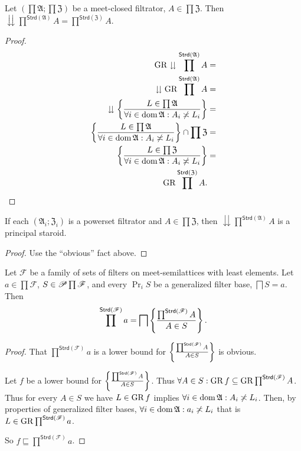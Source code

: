 \begin{prop}
Let $\left(\prod\mathfrak{A};\prod\mathfrak{Z}\right)$ be a meet-closed
filtrator, $A\in\prod\mathfrak{Z}$. Then $\downdownarrows\prod^{\mathsf{Strd}(\mathfrak{A})}A=\prod^{\mathsf{Strd}(\mathfrak{Z})}A$.\end{prop}
\begin{proof}
~
\begin{align*}
\operatorname{GR}\downdownarrows\prod^{\mathsf{Strd}(\mathfrak{A})}A & =\\
\downdownarrows\operatorname{GR}\prod^{\mathsf{Strd}(\mathfrak{A})}A & =\\
\downdownarrows\left\{ \frac{L\in\prod\mathfrak{A}}{\forall i\in\operatorname{dom}\mathfrak{A}:A_{i}\not\asymp L_{i}}\right\} & =\\
\left\{ \frac{L\in\prod\mathfrak{A}}{\forall i\in\operatorname{dom}\mathfrak{A}:A_{i}\not\asymp L_{i}}\right\}\cap\prod\mathfrak{Z} & =\\
\left\{ \frac{L\in\prod\mathfrak{Z}}{\forall i\in\operatorname{dom}\mathfrak{A}:A_{i}\not\asymp L_{i}}\right\} & =\\
\operatorname{GR}\prod^{\mathsf{Strd}(\mathfrak{Z})}A.
\end{align*}
\end{proof}
\begin{cor}
If each $(\mathfrak{A}_{i};\mathfrak{Z}_{i})$ is a powerset filtrator
and $A\in\prod\mathfrak{Z}$, then $\downdownarrows\prod^{\mathsf{Strd}(\mathfrak{A})}A$
is a principal staroid.\end{cor}
\begin{proof}
Use the ``obvious'' fact above.\end{proof}
\begin{thm}
\label{meet-fprods}Let $\mathscr{F}$ be a family of sets of filters
on meet-semilattices with least elements. Let $a\in\prod\mathscr{F}$,
$S\in\mathscr{P}\prod\mathscr{F}$, and every $\Pr_{i}S$ be a generalized
filter base, $\bigsqcap S=a$. Then 
\[
\prod^{\mathsf{Strd}(\mathscr{F})}a=\bigsqcap\left\{ \frac{\prod^{\mathsf{Strd}(\mathscr{F})}A}{A\in S}\right\}.
\]
\end{thm}
\begin{proof}
That $\prod^{\mathsf{Strd}(\mathscr{F})}a$ is a lower bound for $\left\{ \frac{\prod^{\mathsf{Strd}(\mathscr{F})}A}{A\in S}\right\}$
is obvious.

Let $f$ be a lower bound for $\left\{ \frac{\prod^{\mathsf{Strd}(\mathscr{F})}A}{A\in S}\right\}$.
Thus $\forall A\in S:\operatorname{GR} f\subseteq\operatorname{GR}\prod^{\mathsf{Strd}(\mathscr{F})}A$.
Thus for every $A\in S$ we have $L\in\operatorname{GR} f$ implies $\forall i\in\operatorname{dom}\mathfrak{A}:A_{i}\not\asymp L_{i}$.
Then, by properties of generalized filter bases, $\forall i\in\operatorname{dom}\mathfrak{A}:a_{i}\not\asymp L_{i}$
that is $L\in\operatorname{GR}\prod^{\mathsf{Strd}(\mathscr{F})}a$.

So $f\sqsubseteq\prod^{\mathsf{Strd}(\mathscr{F})}a$.\end{proof}
